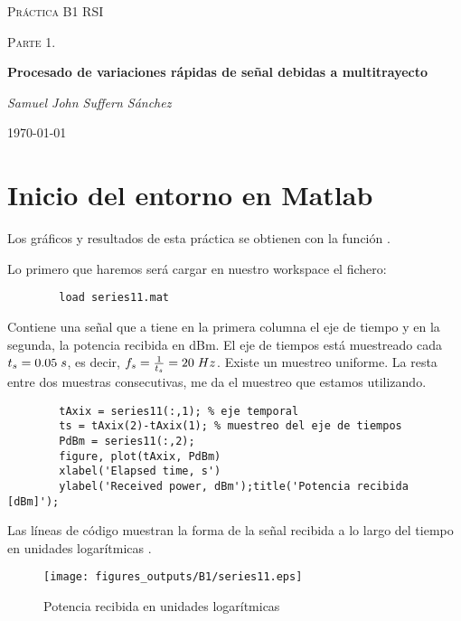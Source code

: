 \documentclass{article}
\begin{document}
\begin{titlepage}
\centering
{\scshape\LARGE Práctica B1 RSI\par}
	\vspace{1cm}
	{\scshape\Large Parte 1. \par}
	\vspace{1.5cm}
	{\huge\bfseries Procesado de variaciones rápidas de señal debidas a multitrayecto\par}
	\vspace{2cm}
	{\Large\itshape Samuel John Suffern Sánchez\par}
	\vfill
	\vfill
	{\large \today\par}
\end{titlepage}


\tableofcontents
\listoffigures
\pagebreak




\section{Inicio del entorno en Matlab}
    \par Los gráficos y resultados de esta práctica se obtienen con la función . 
    \par Lo primero que haremos será cargar en nuestro workspace el fichero: 
    \begin{lstlisting}
        load series11.mat
    \end{lstlisting}

    \par Contiene una señal que a tiene en la primera columna el eje de tiempo y en la segunda, la potencia recibida en dBm. El eje de tiempos está muestreado cada 
    \( t_{s} = 0.05 \hspace{0.1cm} s\), es decir,
    \( f_s = \frac{1}{t_s} = 20 \hspace{0.1cm} Hz\). Existe un muestreo uniforme. La resta entre dos muestras consecutivas, me da el muestreo que estamos utilizando.
    \begin{lstlisting}
        tAxix = series11(:,1); % eje temporal
        ts = tAxix(2)-tAxix(1); % muestreo del eje de tiempos
        PdBm = series11(:,2);
        figure, plot(tAxix, PdBm)
        xlabel('Elapsed time, s')
        ylabel('Received power, dBm');title('Potencia recibida [dBm]');
    \end{lstlisting}
    \par Las líneas de código muestran la forma de la señal recibida a lo largo del tiempo en unidades logarítmicas .
    \begin{figure}[h]
        \centering
        \texttt{[image: figures\_outputs/B1/series11.eps]}
        \caption{Potencia recibida en unidades logarítmicas}
        \label{fig:series_11}
    \end{figure}
\end{document}
